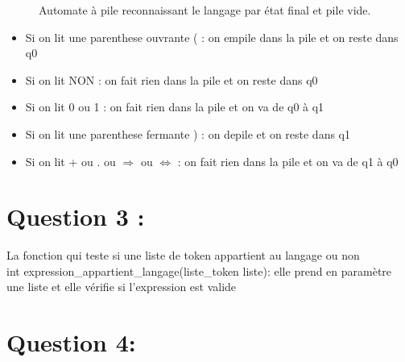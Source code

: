 \documentclass{article}
\begin{document}
\begin{figure}[H]
\caption{Automate à pile reconnaissant le langage par état final et pile vide.}
\end{figure} 
\begin{itemize}
    \item Si on lit une parenthese ouvrante  ( : on empile dans la pile  et on reste dans q0
    \item Si on lit NON : on fait rien dans la pile et on reste dans  q0
    \item Si on lit 0 ou 1 : on fait rien dans la pile et on va de q0 à q1
    \item Si on lit une parenthese fermante ) : on depile et on reste dans q1
    \item Si on lit + ou . ou  \begin{math} \Rightarrow \end{math}  ou \begin{math} \Leftrightarrow{} \end{math} :  on fait rien dans la pile et on va  de q1 à q0 
\end{itemize}

\section*{Question 3 :}

La fonction qui teste si une liste de token appartient au langage ou non\\
int expression\_appartient\_langage(liste\_token liste): elle prend en paramètre une liste et elle vérifie si l'expression est valide 


\section*{Question 4:}
\end{document}
